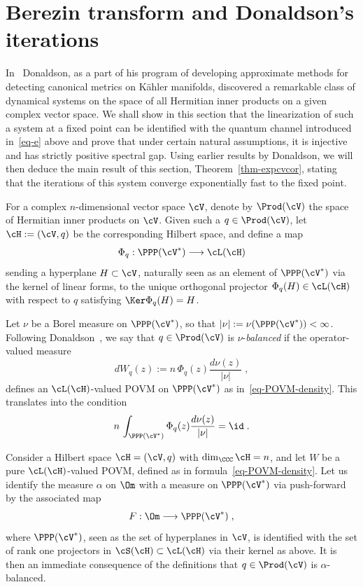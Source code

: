 \section{Berezin transform and Donaldson's iterations}\label{sec-don}
In~\cite{D} Donaldson, as a part of his program of developing approximate methods for detecting canonical metrics on K\"ahler manifolds, discovered a remarkable class of dynamical systems on the space of all Hermitian inner products on a given complex vector space. We shall show in this section that the linearization of such a system at a fixed point can be identified with the quantum channel introduced in~\eqref{eq-e} above and prove that under certain natural assumptions, it is injective and has strictly positive spectral gap. Using earlier results by Donaldson, we will then deduce the main result of this section, Theorem~\ref{thm-expcvcor}, stating that the iterations of this system converge exponentially fast to the fixed point.

For a complex $n$-dimensional vector space $\cV$, denote by $\Prod(\cV)$ the space of Hermitian inner products on $\cV$. Given such a $q\in\Prod(\cV)$, let $\cH:=(\cV,q)$ be the corresponding Hilbert space, and define a map
\begin{equation}\label{Psiqdef}
\Phi_q: \PPP (\cV^*)\longrightarrow\cL(\cH)
\end{equation}
sending a hyperplane $H\subset\cV$, naturally seen as an element of $\PPP(\cV^*)$ via the kernel of linear forms, to the unique orthogonal projector $\Phi_q(H)\in\cL(\cH)$ with respect to $q$ satisfying $\Ker\Phi_q(H)=H$.

Let $\nu$ be a Borel measure on $\PPP (\cV^*)$, so that $|\nu|:= \nu(\PPP (\cV^*)) < \infty$. Following Donaldson~\cite[p.~581]{D}, we say that $q \in \Prod(\cV)$ is $\nu$-\emph{balanced} if the operator-valued measure
\begin{equation}\label{eq-Donaldson-POVM}
dW_q(z):= n\,\Phi_q(z) \frac{d\nu(z)}{|\nu|}\;,
\end{equation}
defines an $\cL(\cH)$-valued POVM on $\PPP (\cV^*)$ as in~\eqref{eq-POVM-density}. This translates into the condition
\begin{equation}\label{eq-Donaldson-POVM-1}
n\,\int_{\PPP (\cV^*)} \Phi_q(z) \frac{d\nu(z)}{|\nu|} = \id\;.
\end{equation}

\begin{exam}\label{exam-general}
Consider a Hilbert space $\cH=(\cV,q)$ with $\dim_\CCC\cH=n$, and let $W$ be a pure $\cL(\cH)$-valued POVM, defined as in formula~\eqref{eq-POVM-density}. Let us identify the measure $\alpha$ on $\Om$ with a measure on $\PPP(\cV^*)$ via push-forward by the associated map
\begin{equation}\label{Fdef}
F:\Om\longrightarrow\PPP(\cV^*)\;,
\end{equation}
where $\PPP(\cV^*)$, seen as the set of hyperplanes in $\cV$, is identified with the set of rank one projectors in $\cS(\cH)\subset\cL(\cH)$ via their kernel as above. It is then an immediate consequence of the definitions that $q\in\Prod(\cV)$ is $\alpha$-balanced.
\end{exam}

